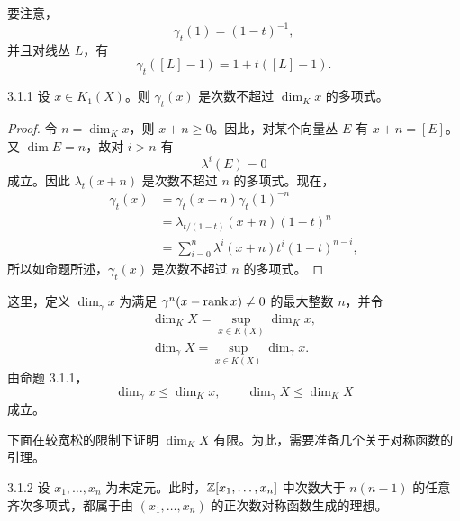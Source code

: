 
要注意，
\[
\gamma_t(1)=(1-t)^{-1},
\]
并且对线丛 $L$，有
\[
\gamma_t([L]-1)=1+t([L]-1).
\]

\begin{proposition*}{3.1.1}
设 $x\in K_1(X)$。则 $\gamma_t(x)$ 是次数不超过 $\dim_K x$ 的多项式。
\end{proposition*}

\begin{proof}
令 $n=\dim_K x$，则 $x+n\ge 0$。因此，对某个向量丛 $E$ 有 $x+n=[E]$。又 $\dim E=n$，故对 $i>n$ 有
\[
\lambda^i(E)=0
\]
成立。因此 $\lambda_t(x+n)$ 是次数不超过 $n$ 的多项式。现在，
\begin{align*}
\gamma_t(x)&=\gamma_t(x+n)\gamma_t(1)^{-n}\\
&=\lambda_{t/(1-t)}(x+n)(1-t)^n\\
&=\sum_{i=0}^{n}\lambda^i(x+n)t^i(1-t)^{n-i},
\end{align*}
所以如命题所述，$\gamma_t(x)$ 是次数不超过 $n$ 的多项式。
\end{proof}


这里，定义 $\dim_\gamma x$ 为满足 $\gamma^n(x-\operatorname{rank} x)\ne 0$ 的最大整数 $n$，并令
\begin{gather*}
\dim_K X=\sup_{x\in K(X)}\dim_K x,\\
\dim_\gamma X=\sup_{x\in K(X)}\dim_\gamma x.
\end{gather*}
由命题 3.1.1，
\[
\dim_\gamma x\le\dim_K x,\qquad
\dim_\gamma X\le\dim_K X
\]
成立。

下面在较宽松的限制下证明 $\dim_K X$ 有限。为此，需要准备几个关于对称函数的引理。

\begin{lemma*}{3.1.2}
设 $x_1,\dots,x_n$ 为未定元。此时，$\mathbb{Z}[x_1,\dots,x_n]$ 中次数大于 $n(n-1)$ 的任意齐次多项式，都属于由 $(x_1,\dots,x_n)$ 的正次数对称函数生成的理想。
\end{lemma*}

